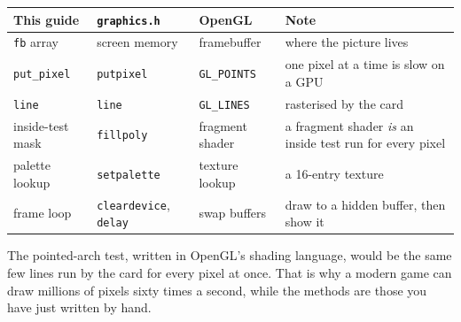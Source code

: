 \begin{tabularx}{\linewidth}{@{}lllX@{}}
\toprule
This guide & \texttt{graphics.h} & OpenGL & Note \\
\midrule
\texttt{fb} array & screen memory & framebuffer & where the picture lives \\
\texttt{put\_pixel} & \texttt{putpixel} & \texttt{GL\_POINTS} & one pixel at a time is slow on a GPU \\
\texttt{line} & \texttt{line} & \texttt{GL\_LINES} & rasterised by the card \\
inside-test mask & \texttt{fillpoly} & fragment shader & a fragment shader \emph{is} an inside test run for every pixel \\
palette lookup & \texttt{setpalette} & texture lookup & a 16-entry texture \\
frame loop & \texttt{cleardevice}, \texttt{delay} & swap buffers & draw to a hidden buffer, then show it \\
\bottomrule
\end{tabularx}

The pointed-arch test, written in OpenGL's shading language, would be the same few lines run by the card for every pixel at once. That is why a modern game can draw millions of pixels sixty times a second, while the methods are those you have just written by hand.
